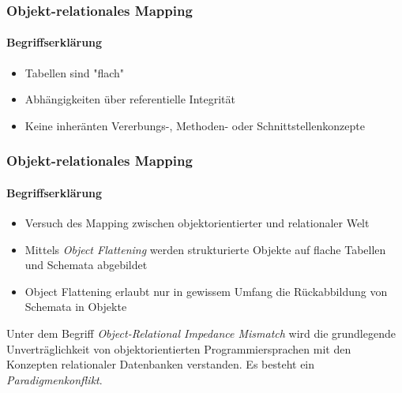 \begin{frame}[t]\frametitle{Objekt-relationales Mapping}
\framesubtitle{Begriffserklärung}
\begin{itemize}
	\item Tabellen sind "flach"
	\item Abhängigkeiten \"uber referentielle Integrit\"at 
	\item Keine inher\"anten Vererbungs-, Methoden- oder Schnittstellenkonzepte
\end{itemize}
\end{frame}

\begin{frame}[t]\frametitle{Objekt-relationales Mapping}
\framesubtitle{Begriffserklärung}
\onslide
{}
\begin{itemize}
	\item Versuch des Mapping zwischen objektorientierter und relationaler Welt 
	\item Mittels \textit{Object Flattening} werden strukturierte Objekte auf flache Tabellen und Schemata abgebildet
	\item Object Flattening erlaubt nur in gewissem Umfang die R\"uckabbildung von Schemata in Objekte
\end{itemize}
\pause
\begin{definition}
	Unter dem Begriff \textit{Object-Relational Impedance Mismatch} wird die grundlegende Unverträglichkeit 
	von objektorientierten Programmiersprachen mit den Konzepten relationaler Datenbanken verstanden. 
	Es besteht ein \textit{Paradigmenkonflikt}.	
\end{definition}
\end{frame}



